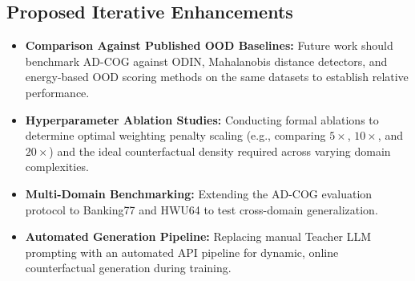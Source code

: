 \documentclass[11pt,a4paper]{article}
\begin{document}
\subsection{Proposed Iterative Enhancements}
\begin{itemize}
    \item \textbf{Comparison Against Published OOD Baselines:} Future work should benchmark AD-COG against ODIN, Mahalanobis distance detectors, and energy-based OOD scoring methods on the same datasets to establish relative performance.
    \item \textbf{Hyperparameter Ablation Studies:} Conducting formal ablations to determine optimal weighting penalty scaling (e.g., comparing $5\times$, $10\times$, and $20\times$) and the ideal counterfactual density required across varying domain complexities.
    \item \textbf{Multi-Domain Benchmarking:} Extending the AD-COG evaluation protocol to Banking77 and HWU64 to test cross-domain generalization.
    \item \textbf{Automated Generation Pipeline:} Replacing manual Teacher LLM prompting with an automated API pipeline for dynamic, online counterfactual generation during training.
\end{itemize}
\end{document}
